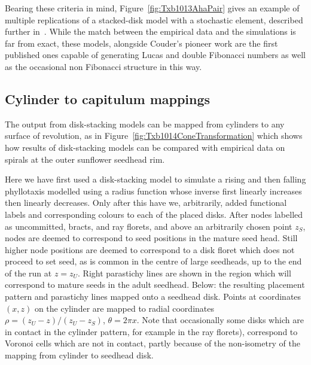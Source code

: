 Bearing these criteria in mind, Figure~\ref{fig:Txb1013AhaPair} gives an example of multiple replications of a stacked-disk model with a stochastic element, described further in~\cite{swintonDiskstackingModelsAre2024}. While the match between the empirical data and the simulations is far from exact, these models, alongside Couder's pioneer work\cite{couderInitialTransitionsOrder1998} are the first published ones capable of generating Lucas and double Fibonacci numbers as well as the occasional non Fibonacci structure in this way.



\subsection{Cylinder to capitulum mappings}

The output from disk-stacking models can be mapped from cylinders to any surface of revolution, as in Figure~\ref{fig:Txb1014ConeTransformation} which shows how  results of disk-stacking models can be compared with empirical data on spirals at the outer sunflower seedhead rim. 

Here we have first used a disk-stacking model to simulate a rising and then falling phyllotaxis modelled using a radius function whose inverse first linearly increases then linearly decreases. Only after this have we, arbitrarily, added  functional labels and corresponding colours to each of the placed disks. After nodes labelled as uncommitted, bracts, and ray florets, and above an arbitrarily chosen point $z_S$, nodes are deemed to correspond to seed positions in the mature seed head.  Still higher node positions are deemed to correspond to a disk floret which does not proceed to set seed, as is common in the centre of large seedheads, up to the end of the run at $z=z_U$.   Right parastichy lines are shown in the region which will correspond to mature seeds in the adult seedhead. Below: the resulting placement pattern and parastichy lines mapped onto a seedhead disk. Points at coordinates $(x,z)$ on the cylinder are mapped to radial coordinates $\rho=(z_U-z)/(z_U-z_S)$, $\theta=2\pi x$. Note that occasionally some disks which are in contact in the cylinder pattern, for example in the ray florets), correspond to Voronoi cells which are not in  contact, partly because of the non-isometry of the mapping from cylinder to seedhead disk.
%

